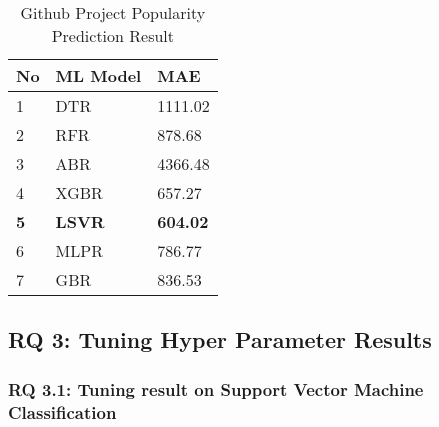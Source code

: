 \begin{table}[]
\begin{tabular}{|l|l|l|}
\hline
{\color[HTML]{000000} \textbf{No}} & {\color[HTML]{000000} \textbf{ML Model}} & {\color[HTML]{000000} \textbf{MAE}}    \\ \hline
{\color[HTML]{000000} 1}           & {\color[HTML]{000000} DTR}               & {\color[HTML]{000000} 1111.02}         \\ \hline
{\color[HTML]{000000} 2}           & {\color[HTML]{000000} RFR}               & {\color[HTML]{000000} 878.68}          \\ \hline
{\color[HTML]{000000} 3}           & {\color[HTML]{000000} ABR}               & {\color[HTML]{000000} 4366.48}         \\ \hline
{\color[HTML]{000000} 4}           & {\color[HTML]{000000} XGBR}              & {\color[HTML]{000000} 657.27}          \\ \hline
{\color[HTML]{000000} \textbf{5}}  & {\color[HTML]{000000} \textbf{LSVR}}     & {\color[HTML]{000000} \textbf{604.02}} \\ \hline
{\color[HTML]{000000} 6}           & {\color[HTML]{000000} MLPR}              & {\color[HTML]{000000} 786.77}          \\ \hline
{\color[HTML]{000000} 7}           & {\color[HTML]{000000} GBR}               & {\color[HTML]{000000} 836.53}          \\ \hline
\end{tabular}
\label{tblRQ2}
\caption{Github Project Popularity Prediction Result}

\end{table}

\subsection{RQ 3: Tuning Hyper Parameter Results}
\subsubsection{RQ 3.1: Tuning result on Support Vector Machine Classification}

